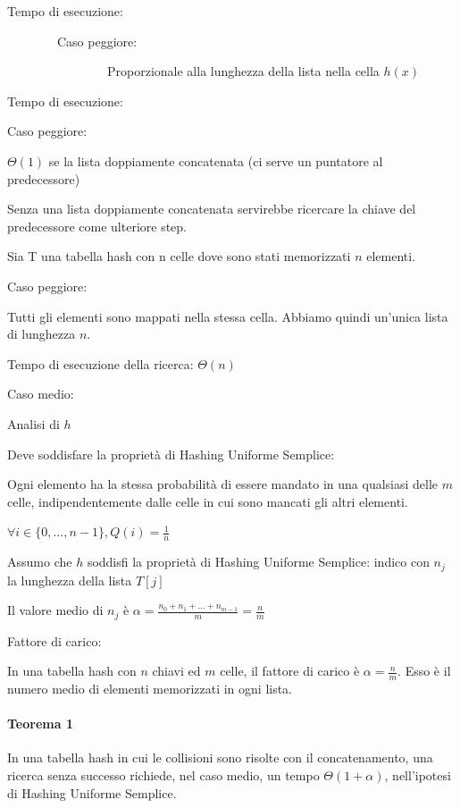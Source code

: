 \documentclass[11pt,a4paper,twoside,openright]{book}
\let\oldparagraph\paragraph
\renewcommand{\paragraph}[1]{\oldparagraph{#1}\mbox{}}
\begin{document}


{Tempo di esecuzione:}

{~~~~~~~~Caso peggiore:}

{~~~~~~~~~~~~~~~~Proporzionale alla lunghezza della lista nella cella $h(x)$}



{Tempo di esecuzione:}

{Caso peggiore:}

{$\Theta(1)$ se la lista doppiamente concatenata (ci serve un puntatore al predecessore)}

{Senza una lista doppiamente concatenata servirebbe ricercare la chiave del predecessore come ulteriore step.}

{Sia T una tabella hash con n celle dove sono stati memorizzati $n$ elementi. }

{Caso peggiore:}

{Tutti gli elementi sono mappati nella stessa cella. Abbiamo quindi
un'unica lista di lunghezza $n$.}

{Tempo di esecuzione della ricerca: $\Theta(n)$}

{Caso medio:}

{Analisi di $h$}

{Deve soddisfare la proprietà di }{Hashing Uniforme Semplice:}

{Ogni elemento ha la stessa probabilità di essere mandato in una qualsiasi delle $m$ celle, indipendentemente dalle celle in cui sono mancati gli altri elementi.}

$\forall i \in \{0,\ldots,n-1\}, Q(i) = \frac{1}{n}$

{Assumo che $h$ soddisfi la proprietà di Hashing Uniforme Semplice: indico con $n_j$ la lunghezza della lista $T[j]$}

{Il valore medio di $n_j$ è $\alpha=\frac{n_0+n_1+\ldots+n_{m-1}}{m}=\frac{n}{m}$}

{Fattore di carico: }

{In una tabella hash con $n$ chiavi ed $m$ celle, il fattore di carico è $\alpha = \frac{n}{m}$. Esso è il numero medio di elementi memorizzati in ogni lista.}

\paragraph{Teorema 1}

{In una tabella hash in cui le collisioni sono risolte con il concatenamento, una ricerca senza successo richiede, nel caso medio, un tempo $\Theta(1+\alpha)$, nell'ipotesi di Hashing Uniforme Semplice.}
\end{document}
